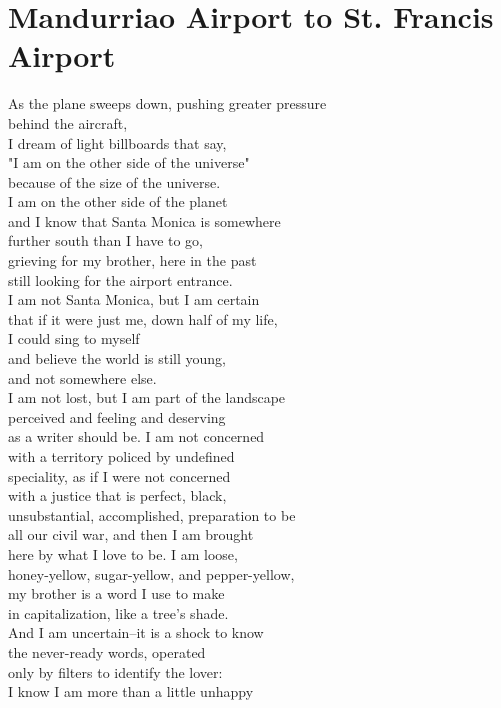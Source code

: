 \documentclass[smalldemyvopaper,11pt,twoside,onecolumn,openright,extrafontsizes]{memoir}
\begin{document}
\chapter{Mandurriao Airport to St. Francis Airport}
As the plane sweeps down, pushing greater pressure
\\behind the aircraft,
\\I dream of light billboards that say,
\\"I am on the other side of the universe"
\\because of the size of the universe.
\\I am on the other side of the planet
\\and I know that Santa Monica is somewhere
\\further south than I have to go,
\\grieving for my brother, here in the past
\\still looking for the airport entrance.
\\I am not Santa Monica, but I am certain
\\that if it were just me, down half of my life,
\\I could sing to myself
\\and believe the world is still young,
\\and not somewhere else.
\\I am not lost, but I am part of the landscape
\\perceived and feeling and deserving
\\as a writer should be. I am not concerned
\\with a territory policed by undefined
\\speciality, as if I were not concerned
\\with a justice that is perfect, black,
\\unsubstantial, accomplished, preparation to be
\\all our civil war, and then I am brought
\\here by what I love to be. I am loose,
\\honey-yellow, sugar-yellow, and pepper-yellow,
\\my brother is a word I use to make
\\in capitalization, like a tree's shade.
\\And I am uncertain--it is a shock to know
\\the never-ready words, operated
\\only by filters to identify the lover:
\\I know I am more than a little unhappy
\end{document}
